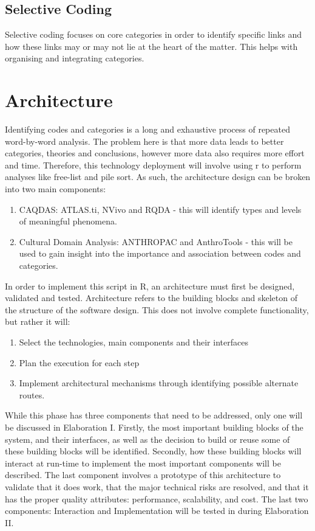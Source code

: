 \documentclass{article}
\begin{document}
\subsection{Selective Coding}
Selective coding focuses on core categories in order to identify specific links and how these links may or may not lie at the heart of the matter. This helps with organising and integrating categories. 

\section{Architecture}
Identifying codes and categories is a long and exhaustive process of repeated word-by-word analysis. The problem here is that more data leads to better categories, theories and conclusions, however more data also requires more effort and time. Therefore, this technology deployment will involve using r to perform analyses like free-list and pile sort. As such, the architecture design can be broken into two main components:
\begin{enumerate}
\item CAQDAS: ATLAS.ti, NVivo and RQDA -  this will identify types and levels of meaningful phenomena.
\item Cultural Domain Analysis: ANTHROPAC and AnthroTools -  this will be used to gain insight into the importance and association between codes and categories.
\end{enumerate}
In order to implement this script in R, an architecture must first be designed, validated and tested. Architecture refers to the building blocks and skeleton of the structure of the software design. This does not involve complete functionality, but rather it will:
\begin{enumerate}
    \item Select the technologies, main components and their interfaces
    \item Plan the execution for each step
    \item Implement architectural mechanisms through identifying possible alternate routes.
\end{enumerate}
While this phase has three components that need to be addressed, only one will be discussed in Elaboration I. Firstly, the most important building blocks of the system, and their interfaces, as well as the decision to build or reuse some of these building blocks will be identified. Secondly, how these building blocks will interact at run-time to implement the most important components will be described. The last component involves a prototype of this architecture to validate that it does work, that the major technical risks are resolved, and that it has the proper quality attributes: performance, scalability, and cost. The last two components: Interaction and Implementation will be tested in during Elaboration II.
\end{document}
